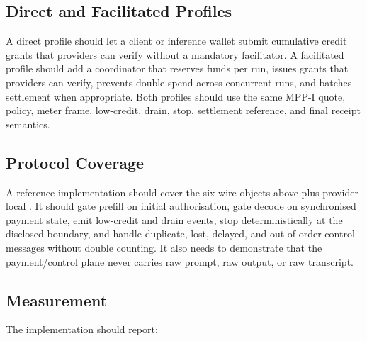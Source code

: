 \documentclass[11pt]{article}
\newcommand{\field}[1]{\texttt{\detokenize{#1}}}
\newcommand{\mppi}{MPP-I}
\begin{document}
\subsection{Direct and Facilitated Profiles}

A direct profile should let a client or inference wallet submit cumulative credit grants that providers can verify without a mandatory facilitator. A facilitated profile should add a coordinator that reserves funds per run, issues grants that providers can verify, prevents double spend across concurrent runs, and batches settlement when appropriate. Both profiles should use the same \mppi{} quote, policy, meter frame, low-credit, drain, stop, settlement reference, and final receipt semantics.

\subsection{Protocol Coverage}

A reference implementation should cover the six wire objects above plus provider-local \field{RunPaymentState}. It should gate prefill on initial authorisation, gate decode on synchronised payment state, emit low-credit and drain events, stop deterministically at the disclosed boundary, and handle duplicate, lost, delayed, and out-of-order control messages without double counting. It also needs to demonstrate that the payment/control plane never carries raw prompt, raw output, or raw transcript.

\subsection{Measurement}

The implementation should report:
\end{document}
